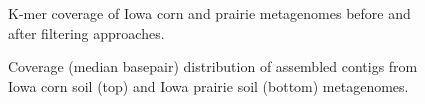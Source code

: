 \documentclass{nature}%
\begin{document}
\newpage

\begin{figure}[ht]
\caption{K-mer coverage of Iowa corn and prairie metagenomes before
  and after filtering approaches.}
\label{diginormcoverage}
\end{figure}

\newpage

\begin{figure}[ht]
\caption{Coverage (median basepair) distribution of assembled contigs
  from Iowa corn soil (top) and Iowa prairie soil (bottom) metagenomes.}
\label{soilassemblycoverage}
\end{figure}
\end{document}
